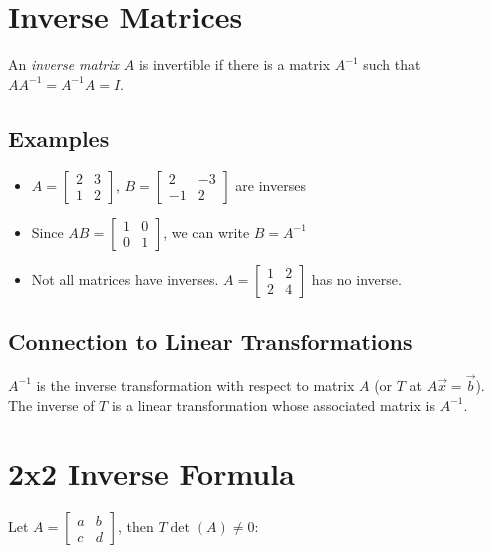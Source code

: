 \documentclass[12pt,a4paper]{article}
\begin{document}
\section{Inverse Matrices}

An \textit{inverse matrix} $A$ is invertible if there is a matrix $A^{-1}$ such that $AA^{-1} = A^{-1}A = I$.

\subsection{Examples}

\begin{itemize}
    \item $A = \begin{bmatrix} 2 & 3 \\ 1 & 2 \end{bmatrix}$, $B = \begin{bmatrix} 2 & -3 \\ -1 & 2 \end{bmatrix}$ are inverses
    \item Since $AB = \begin{bmatrix} 1 & 0 \\ 0 & 1 \end{bmatrix}$, we can write $B = A^{-1}$
    \item Not all matrices have inverses. $A = \begin{bmatrix} 1 & 2 \\ 2 & 4 \end{bmatrix}$ has no inverse.
\end{itemize}

\subsection{Connection to Linear Transformations}

$A^{-1}$ is the inverse transformation with respect to matrix $A$ (or $T$ at $A \vec{x} = \vec{b}$). The inverse of $T$ is a linear transformation whose associated matrix is $A^{-1}$.

\section{2x2 Inverse Formula}

Let $A = \begin{bmatrix} a & b \\ c & d \end{bmatrix}$, then $T \det(A) \neq 0$:
\end{document}

